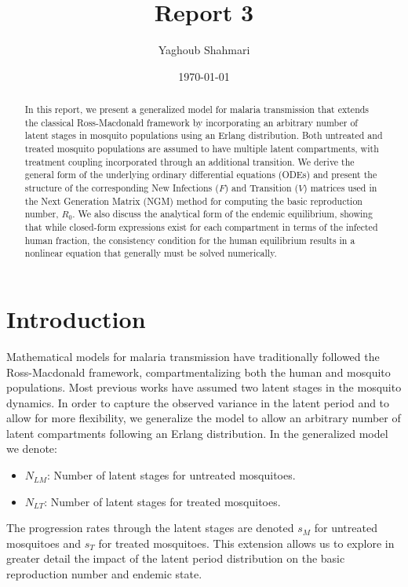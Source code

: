 \documentclass[12pt]{article}
\title{Report 3}
\author{Yaghoub Shahmari}
\date{\today}
\begin{document}
\maketitle

\begin{abstract}
In this report, we present a generalized model for malaria transmission that extends the classical Ross-Macdonald framework by incorporating an arbitrary number of latent stages in mosquito populations using an Erlang distribution. Both untreated and treated mosquito populations are assumed to have multiple latent compartments, with treatment coupling incorporated through an additional transition. We derive the general form of the underlying ordinary differential equations (ODEs) and present the structure of the corresponding New Infections (\(F\)) and Transition (\(V\)) matrices used in the Next Generation Matrix (NGM) method for computing the basic reproduction number, \(R_0\). We also discuss the analytical form of the endemic equilibrium, showing that while closed-form expressions exist for each compartment in terms of the infected human fraction, the consistency condition for the human equilibrium results in a nonlinear equation that generally must be solved numerically.
\end{abstract}

\section{Introduction}
Mathematical models for malaria transmission have traditionally followed the Ross-Macdonald framework, compartmentalizing both the human and mosquito populations. Most previous works have assumed two latent stages in the mosquito dynamics. In order to capture the observed variance in the latent period and to allow for more flexibility, we generalize the model to allow an arbitrary number of latent compartments following an Erlang distribution. In the generalized model we denote:
\begin{itemize}
  \item \(N_{LM}\): Number of latent stages for untreated mosquitoes.
  \item \(N_{LT}\): Number of latent stages for treated mosquitoes.
\end{itemize}
The progression rates through the latent stages are denoted \(s_M\) for untreated mosquitoes and \(s_T\) for treated mosquitoes. This extension allows us to explore in greater detail the impact of the latent period distribution on the basic reproduction number and endemic state.
\end{document}
